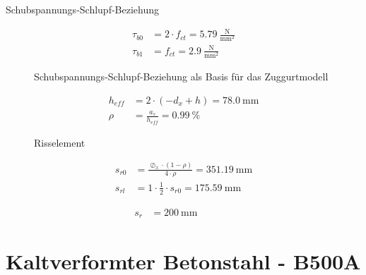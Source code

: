 \documentclass[
  11pt,
  letterpaper,
]{scrreprt}
\begin{document}
Schubspannungs-Schlupf-Beziehung

\[
\begin{aligned}
\tau_{b0}& = 2 \cdot f_{ct} = 5.79 \ \frac{\mathrm{N}}{\mathrm{mm}^{2}} \\ 
\tau_{b1}& = f_{ct} = 2.9 \ \frac{\mathrm{N}}{\mathrm{mm}^{2}} \end{aligned}
\]

\begin{figure}[H]


\caption{\label{fig-jag_tau_delta}Schubspannungs-Schlupf-Beziehung als
Basis für das Zuggurtmodell}

\end{figure}%

\[
\begin{aligned}
h_{eff}& = 2 \cdot \left(- d_{x} + h\right) = 78.0 \ \mathrm{mm} \\ 
\rho& = \frac{a_{s}}{h_{eff}} = 0.99 \ \mathrm{\%} \end{aligned}
\]

\begin{figure}[H]


\caption{\label{fig-jag_risselement}Risselement}

\end{figure}%

\[
\begin{aligned}
s_{r0}& = \frac{\oslash_{x} \cdot \left(1 - \rho\right)}{4 \cdot \rho} = 351.19 \ \mathrm{mm} \\ 
s_{rl}& = 1 \cdot \frac{1}{2} \cdot s_{r0} = 175.59 \ \mathrm{mm} \end{aligned}
\]

\[
\begin{aligned}
s_{r}& = 200 \ \mathrm{mm} \quad &  \quad &  
 \end{aligned}
\]

\section{Kaltverformter Betonstahl -
B500A}\label{kaltverformter-betonstahl---b500a}
\end{document}

